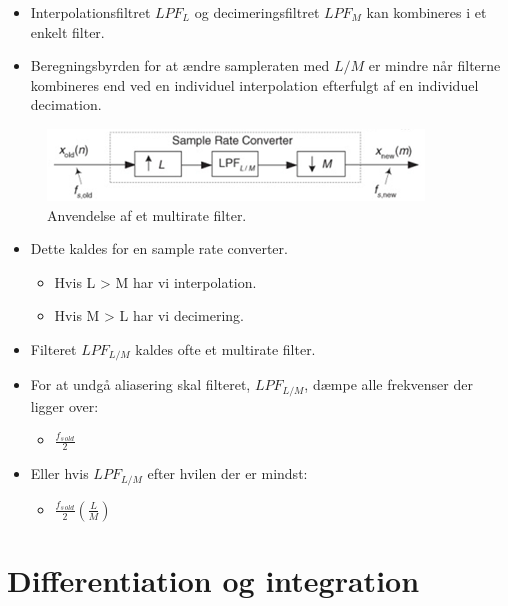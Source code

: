 \documentclass[danish]{article}
\begin{document}
\begin{itemize}
	\item Interpolationsfiltret $LPF_L$ og decimeringsfiltret $LPF_M$ kan kombineres i et enkelt filter.
	\item Beregningsbyrden for at ændre sampleraten med $L/M$ er mindre når filterne kombineres end ved en individuel interpolation efterfulgt af en individuel decimation. 
\end{itemize}

\begin{figure}[H]
	\centering
	\includegraphics[width=0.4\linewidth]{graphics/multirate2}
	\caption{Anvendelse af et multirate filter.}
	\label{fig:multirate2}
\end{figure}

\begin{itemize}
	\item Dette kaldes for en sample rate converter.
	\begin{itemize}
		\item Hvis L > M har vi interpolation.
		\item Hvis M > L har vi decimering.	
	\end{itemize}
	\item Filteret $LPF_{L/M}$ kaldes ofte et multirate filter.
\end{itemize}

\begin{itemize}
	\item For at undgå aliasering skal filteret, $LPF_{L/M}$, dæmpe alle frekvenser der ligger over:
	\begin{itemize}
		\item $\frac{f_{s\,old}}{2}$
	\end{itemize}
	\item Eller hvis $LPF_{L/M}$ efter hvilen der er mindst:
	\begin{itemize}
		\item $\frac{f_{s\,old}}{2}(\frac{L}{M})$
	\end{itemize}
\end{itemize}








\newpage
\section{Differentiation og integration}
\end{document}

